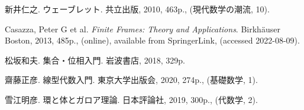 \documentclass[../../main]{subfiles}
\begin{document}
\begin{thebibliography}{99}
    新井仁之. ウェーブレット. 共立出版, 2010, 463p., (現代数学の潮流, 10).

    Casazza, Peter G et al. \textit{Finite Frames: Theory and Applications}. Birkhäuser Boston, 2013, 485p., (online), available from SpringerLink, (accessed 2022-08-09).

    松坂和夫. 集合・位相入門. 岩波書店, 2018, 329p.

    齋藤正彦. 線型代数入門. 東京大学出版会, 2020, 274p., (基礎数学, 1).

    雪江明彦. 環と体とガロア理論. 日本評論社, 2019, 300p., (代数学, 2).
\end{thebibliography}
\end{document}
